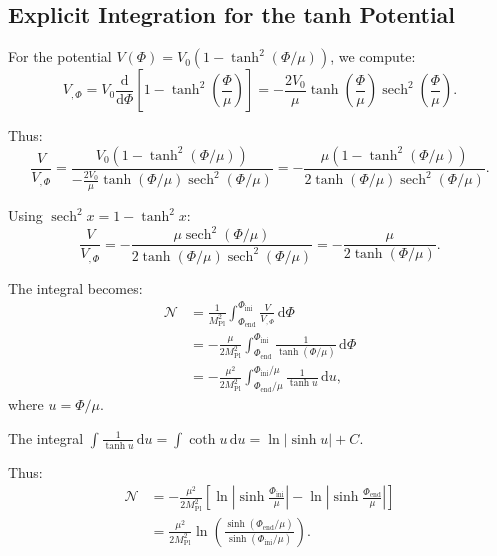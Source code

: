 \documentclass[11pt,a4paper]{article}
\numberwithin{equation}{section}
\theoremstyle{plain}
\theoremstyle{definition}
\theoremstyle{remark}
\newcommand{\dd}{\mathrm{d}}
\begin{document}
\subsection{Explicit Integration for the tanh Potential}

For the potential $V(\Phi) = V_0(1 - \tanh^2(\Phi/\mu))$, we compute:
\begin{equation}
V_{,\Phi} = V_0\frac{\dd}{\dd\Phi}\left[1 - \tanh^2\left(\frac{\Phi}{\mu}\right)\right] = -\frac{2V_0}{\mu}\tanh\left(\frac{\Phi}{\mu}\right)\operatorname{sech}^2\left(\frac{\Phi}{\mu}\right).
\end{equation}

Thus:
\begin{equation}
\frac{V}{V_{,\Phi}} = \frac{V_0(1-\tanh^2(\Phi/\mu))}{-\frac{2V_0}{\mu}\tanh(\Phi/\mu)\operatorname{sech}^2(\Phi/\mu)} = -\frac{\mu(1-\tanh^2(\Phi/\mu))}{2\tanh(\Phi/\mu)\operatorname{sech}^2(\Phi/\mu)}.
\end{equation}

Using $\operatorname{sech}^2 x = 1 - \tanh^2 x$:
\begin{equation}
\frac{V}{V_{,\Phi}} = -\frac{\mu\operatorname{sech}^2(\Phi/\mu)}{2\tanh(\Phi/\mu)\operatorname{sech}^2(\Phi/\mu)} = -\frac{\mu}{2\tanh(\Phi/\mu)}.
\end{equation}

The integral becomes:
\begin{align}
\mathcal{N} &= \frac{1}{M_{\mathrm{Pl}}^2}\int_{\Phi_{\mathrm{end}}}^{\Phi_{\mathrm{ini}}} \frac{V}{V_{,\Phi}}\,\dd\Phi\\
&= -\frac{\mu}{2M_{\mathrm{Pl}}^2}\int_{\Phi_{\mathrm{end}}}^{\Phi_{\mathrm{ini}}} \frac{1}{\tanh(\Phi/\mu)}\,\dd\Phi\\
&= -\frac{\mu^2}{2M_{\mathrm{Pl}}^2}\int_{\Phi_{\mathrm{end}}/\mu}^{\Phi_{\mathrm{ini}}/\mu} \frac{1}{\tanh u}\,\dd u,
\end{align}
where $u = \Phi/\mu$.

The integral $\int \frac{1}{\tanh u}\,\dd u = \int \coth u\,\dd u = \ln|\sinh u| + C$.

Thus:
\begin{align}
\mathcal{N} &= -\frac{\mu^2}{2M_{\mathrm{Pl}}^2}\left[\ln\left|\sinh\frac{\Phi_{\mathrm{ini}}}{\mu}\right| - \ln\left|\sinh\frac{\Phi_{\mathrm{end}}}{\mu}\right|\right]\\
&= \frac{\mu^2}{2M_{\mathrm{Pl}}^2}\ln\left(\frac{\sinh(\Phi_{\mathrm{end}}/\mu)}{\sinh(\Phi_{\mathrm{ini}}/\mu)}\right).
\label{eq:efolds-tanh-exact}
\end{align}
\end{document}
